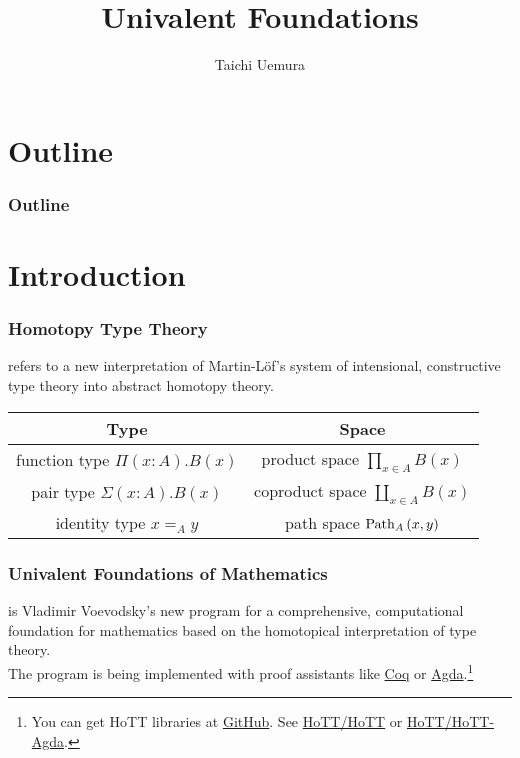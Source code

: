 \documentclass[dvipdfmx]{beamer}
\title{Univalent Foundations}
\author{Taichi Uemura}
\begin{document}
\begin{frame}
  \titlepage
\end{frame}

\section{Outline}

\begin{frame}
  \frametitle{Outline}
  \tableofcontents
\end{frame}

\section{Introduction}

\begin{frame}
  \frametitle{Homotopy Type Theory}
  refers to a new interpretation of Martin-L\"of's system of
  intensional, constructive type theory into
  abstract homotopy theory.\cite{hottbook}

  \begin{center}
    \begin{tabular}{cc}
      \toprule
      Type & Space \\
      \midrule
      function type
      $\Pi \left( x : A \right) . B \left( x \right)$
      & product space
      $\prod _{x \in A} B \left( x \right)$ \\
      pair type
      $\Sigma \left( x : A \right) . B \left( x \right)$
      & coproduct space
      $\coprod _{x \in A} B \left( x \right)$ \\
      identity type
      $x =_A y$
      & path space
      ${\rm Path}_A\left( x , y \right)$ \\
      \bottomrule
    \end{tabular}
  \end{center}
\end{frame}

\begin{frame}
  \frametitle{Univalent Foundations of Mathematics}
  is Vladimir Voevodsky's new program
  for a comprehensive, computational foundation for mathematics
  based on the homotopical interpretation of type theory.
  \\
  The program is being implemented with proof assistants
  like \href{https://coq.inria.fr/}{Coq}
  or \href{http://wiki.portal.chalmers.se/agda/pmwiki.php}{Agda}.\footnote{
    You can get HoTT libraries at \href{https://github.com/}{GitHub}.
    See \href{https://github.com/HoTT/HoTT}{HoTT/HoTT}
    or \href{https://github.com/HoTT/HoTT-Agda}{HoTT/HoTT-Agda}.
  }
\end{frame}
\end{document}
